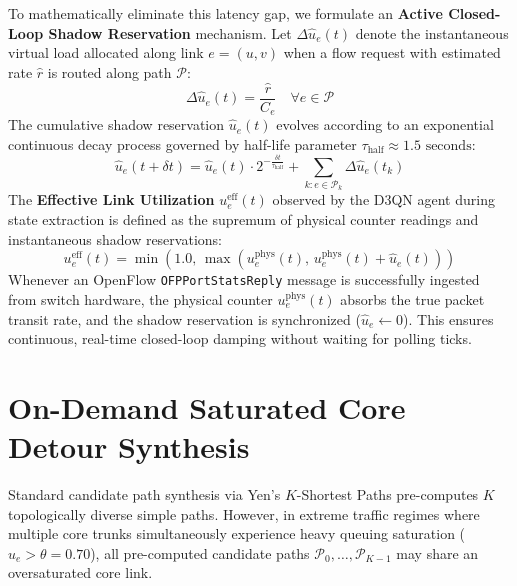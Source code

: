 To mathematically eliminate this latency gap, we formulate an \textbf{Active Closed-Loop Shadow Reservation} mechanism. Let $\Delta \hat{u}_e(t)$ denote the instantaneous virtual load allocated along link $e = (u, v)$ when a flow request with estimated rate $\hat{r}$ is routed along path $\mathcal{P}$:
\begin{equation}
    \Delta \hat{u}_e(t) = \frac{\hat{r}}{C_e} \quad \forall e \in \mathcal{P}
\end{equation}
The cumulative shadow reservation $\hat{u}_e(t)$ evolves according to an exponential continuous decay process governed by half-life parameter $\tau_{\text{half}} \approx 1.5\text{ seconds}$:
\begin{equation}
    \hat{u}_e(t + \delta t) = \hat{u}_e(t) \cdot 2^{-\frac{\delta t}{\tau_{\text{half}}}} + \sum_{k: e \in \mathcal{P}_k} \Delta \hat{u}_e(t_k)
\end{equation}
The \textbf{Effective Link Utilization} $u_e^{\text{eff}}(t)$ observed by the D3QN agent during state extraction is defined as the supremum of physical counter readings and instantaneous shadow reservations:
\begin{equation}
    u_e^{\text{eff}}(t) = \min\left(1.0, \, \max\left( u_e^{\text{phys}}(t), \, u_e^{\text{phys}}(t) + \hat{u}_e(t) \right)\right)
\end{equation}
Whenever an OpenFlow \texttt{OFPPortStatsReply} message is successfully ingested from switch hardware, the physical counter $u_e^{\text{phys}}(t)$ absorbs the true packet transit rate, and the shadow reservation is synchronized ($\hat{u}_e \leftarrow 0$). This ensures continuous, real-time closed-loop damping without waiting for polling ticks.

\section{On-Demand Saturated Core Detour Synthesis}
\label{sec:ondemand_detour_math}
Standard candidate path synthesis via Yen's $K$-Shortest Paths pre-computes $K$ topologically diverse simple paths. However, in extreme traffic regimes where multiple core trunks simultaneously experience heavy queuing saturation ($u_e > \theta = 0.70$), all pre-computed candidate paths $\mathcal{P}_0, \dots, \mathcal{P}_{K-1}$ may share an oversaturated core link.

